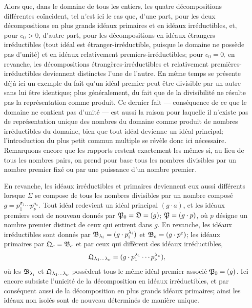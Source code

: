Alors que, dans le domaine de tous les entiers, les quatre décompositions différentes coïncident, tel n'est ici le cas que, d'une part, pour les deux décompositions en plus grands idéaux primaires et en idéaux irréductibles, et, pour $e_0>0$, d'autre part, pour les décompositions en idéaux étrangers-irréductibles (tout idéal est étranger-irréductible, puisque le domaine ne possède pas d'unité) et en idéaux relativement premiers-irréductibles; pour $e_0=0$, en revanche, les décompositions étrangères-irréductibles et relativement premières-irréductibles deviennent distinctes l'une de l'autre. En même temps se présente déjà ici un exemple du fait qu'un idéal premier peut être divisible par un autre sans lui être identique; plus généralement, du fait que de la divisibilité ne résulte pas la représentation comme produit. Ce dernier fait --- conséquence de ce que le domaine ne contient pas d'unité --- est aussi la raison pour laquelle il n'existe pas de représentation unique des nombres du domaine comme produit de nombres irréductibles du domaine, bien que tout idéal devienne un idéal principal; l'introduction du plus petit commun multiple se révèle donc ici nécessaire. Remarquons encore que les rapports restent exactement les mêmes si, au lieu de tous les nombres pairs, on prend pour base tous les nombres divisibles par un nombre premier fixé ou par une puissance d'un nombre premier.

En revanche, les idéaux irréductibles et primaires deviennent eux aussi différents lorsque $\Sigma$ se compose de tous les nombres divisibles par un nombre composé $g=p_1^{\sigma_1}\cdots p_\nu^{\sigma_\nu}$. Tout idéal redevient un idéal principal $(g\cdot a)$, et les idéaux premiers sont de nouveau donnés par $\mathfrak{P}_0=\mathfrak{D}=(g)$; $\mathfrak{P}=(g\cdot p)$, où $p$ désigne un nombre premier distinct de ceux qui entrent dans $g$. En revanche, les idéaux irréductibles sont donnés par $\mathfrak{B}_{\lambda_i}=(g\cdot p_i^{\lambda_i})$ et $\mathfrak{B}_e=(g\cdot p^e)$; les idéaux primaires par $\mathfrak{Q}_e=\mathfrak{B}_e$ et par ceux qui diffèrent des idéaux irréductibles,
\[
 \mathfrak{Q}_{\lambda_1\ldots\lambda_\nu}=(g\cdot p_1^{\lambda_1}\cdots p_\nu^{\lambda_\nu}),
\]
où les $\mathfrak{B}_{\lambda_i}$ et $\mathfrak{Q}_{\lambda_1\ldots\lambda_\nu}$ possèdent tous le même idéal premier associé $\mathfrak{P}_0=(g)$. Ici encore subsiste l'unicité de la décomposition en idéaux irréductibles, et par conséquent aussi de la décomposition en plus grands idéaux primaires; ainsi les idéaux non isolés sont de nouveau déterminés de manière unique.

